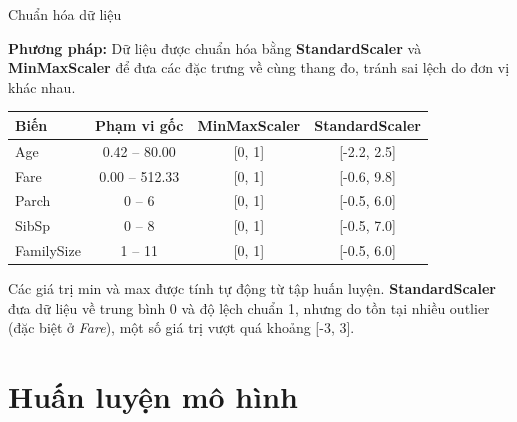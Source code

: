 \documentclass[
	11pt
]{beamer}
\begin{document}
\begin{frame}{Chuẩn hóa dữ liệu}
	
	\textbf{Phương pháp:}  
	Dữ liệu được chuẩn hóa bằng \textbf{StandardScaler} và \textbf{MinMaxScaler}  
	để đưa các đặc trưng về cùng thang đo, tránh sai lệch do đơn vị khác nhau.
	
	\vspace{0.8em}
	\centering
	\begin{tabular}{|l|c|c|c|}
		\hline
		\textbf{Biến} & \textbf{Phạm vi gốc} & \textbf{MinMaxScaler} & \textbf{StandardScaler} \\
		\hline
		Age & 0.42 -- 80.00 & [0, 1] & [-2.2, 2.5] \\
		Fare & 0.00 -- 512.33 & [0, 1] & [-0.6, 9.8] \\
		Parch & 0 -- 6 & [0, 1] & [-0.5, 6.0] \\
		SibSp & 0 -- 8 & [0, 1] & [-0.5, 7.0] \\
		FamilySize & 1 -- 11 & [0, 1] & [-0.5, 6.0] \\
		\hline
	\end{tabular}
	
	\vspace{0.6em}
	\small{
		Các giá trị min và max được tính tự động từ tập huấn luyện.  
		\textbf{StandardScaler} đưa dữ liệu về trung bình 0 và độ lệch chuẩn 1,  
		nhưng do tồn tại nhiều outlier (đặc biệt ở \textit{Fare}),  
		một số giá trị vượt quá khoảng [-3, 3].
	}
	
\end{frame}


\section{Huấn luyện mô hình}
\end{document}

